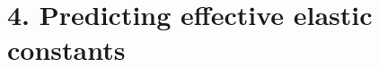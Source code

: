 \documentclass[amsmath,preprintnumbers,10pt,nofootinbib,prl,twocolumn]{revtex4-1}
\begin{document}

\section{4. Predicting effective elastic constants}
\end{document}
